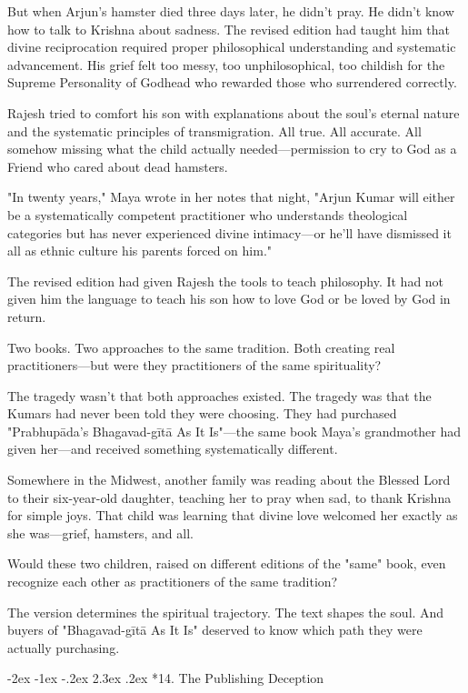 \documentclass[12pt,twoside]{book}
\makeatletter
\def\cleardoublepage{\clearpage\if@twoside \ifodd\c@page\else\hbox{}\thispagestyle{empty}\newpage\if@twocolumn\hbox{}\newpage\fi\fi\fi}
\renewcommand\section{\@startsection{section}{1}{\z@}%
{-2ex \@plus -1ex \@minus -.2ex}%
{2.3ex \@plus.2ex}%
{\normalfont\Large\bfseries}}
\makeatother
\begin{document}
But when Arjun's hamster died three days later, he didn't pray. He didn't know how to talk to Krishna about sadness. The revised edition had taught him that divine reciprocation required proper philosophical understanding and systematic advancement. His grief felt too messy, too unphilosophical, too childish for the Supreme Personality of Godhead who rewarded those who surrendered correctly.

Rajesh tried to comfort his son with explanations about the soul's eternal nature and the systematic principles of transmigration. All true. All accurate. All somehow missing what the child actually needed—permission to cry to God as a Friend who cared about dead hamsters.

"In twenty years," Maya wrote in her notes that night, "Arjun Kumar will either be a systematically competent practitioner who understands theological categories but has never experienced divine intimacy—or he'll have dismissed it all as ethnic culture his parents forced on him."

The revised edition had given Rajesh the tools to teach philosophy. It had not given him the language to teach his son how to love God or be loved by God in return.

Two books. Two approaches to the same tradition. Both creating real practitioners—but were they practitioners of the same spirituality?

The tragedy wasn't that both approaches existed. The tragedy was that the Kumars had never been told they were choosing. They had purchased "Prabhupāda's Bhagavad-gītā As It Is"—the same book Maya's grandmother had given her—and received something systematically different.

Somewhere in the Midwest, another family was reading about the Blessed Lord to their six-year-old daughter, teaching her to pray when sad, to thank Krishna for simple joys. That child was learning that divine love welcomed her exactly as she was—grief, hamsters, and all.

Would these two children, raised on different editions of the "same" book, even recognize each other as practitioners of the same tradition?

The version determines the spiritual trajectory. The text shapes the soul. And buyers of "Bhagavad-gītā As It Is" deserved to know which path they were actually purchasing.

\cleardoublepage
\vspace*{0.20\textheight}
\section*{14. The Publishing Deception}
\thispagestyle{chapterpage}
\end{document}

